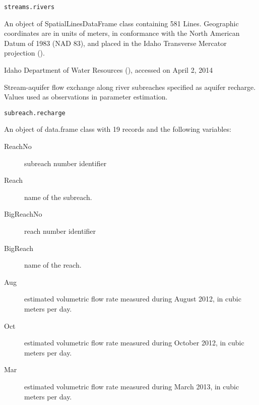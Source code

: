 \documentclass[a4paper]{book}
\begin{document}
%
\begin{Usage}
\begin{verbatim}
streams.rivers
\end{verbatim}
\end{Usage}
%
\begin{Format}
An object of SpatialLinesDataFrame class containing 581 Lines.
Geographic coordinates are in units of meters, in conformance with the
North American Datum of 1983 (NAD 83), and placed in the
Idaho Transverse Mercator projection ().
\end{Format}
%
\begin{Source}\relax
Idaho Department of Water Resources
(),
accessed on April 2, 2014
\end{Source}
%
\begin{Examples}
\end{Examples}
%
\begin{Description}\relax
Stream-aquifer flow exchange along river subreaches specified as aquifer recharge.
Values used as observations in parameter estimation.
\end{Description}
%
\begin{Usage}
\begin{verbatim}
subreach.recharge
\end{verbatim}
\end{Usage}
%
\begin{Format}
An object of data.frame class with 19 records and the following variables:
\begin{description}

\item[ReachNo] subreach number identifier
\item[Reach] name of the subreach.
\item[BigReachNo] reach number identifier
\item[BigReach] name of the reach.
\item[Aug] estimated volumetric flow rate measured during August 2012,
in cubic meters per day.
\item[Oct] estimated volumetric flow rate measured during October 2012,
in cubic meters per day.
\item[Mar] estimated volumetric flow rate measured during March 2013,
in cubic meters per day.

\end{description}
\end{Format}
\end{document}
